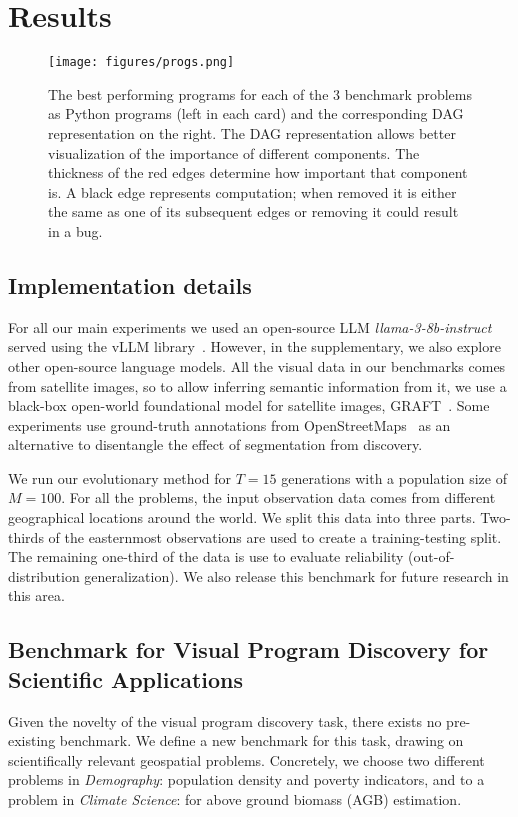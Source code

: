 \section{Results}
\label{sec:results}

\begin{figure}[ht]
    \centering
\texttt{[image: figures/progs.png]}
\caption{The best performing programs for each of the 3 benchmark problems as Python programs (left in each card) and the corresponding DAG representation on the right.
The DAG representation allows better visualization of the importance of different components.
The thickness of the red edges determine how important that component is. 
A black edge represents computation; when removed it is either the same as one of its subsequent edges or removing it could result in a bug.
}
\label{fig:mainresults}

\end{figure}

\subsection{Implementation details}
For all our main experiments we used an open-source LLM \emph{llama-3-8b-instruct}~\citep{dubey2024llama} served using the vLLM library~\citep{kwon2023vllm}.
However, in the supplementary, we also explore other open-source language models.
All the visual data in our benchmarks comes from satellite images, so to allow inferring semantic information from it, we use a black-box open-world foundational model for satellite images, GRAFT~\citep{mall2023graft}. 
Some experiments use ground-truth annotations from OpenStreetMaps~\citep{vargas2020osm} as an alternative to disentangle the effect of segmentation from discovery. 

We run our evolutionary method for $T=15$ generations with a population size of $M=100$. 
For all the problems, the input observation data comes from different geographical locations around the world. 
We split this data into three parts. Two-thirds of the easternmost observations are used to create a training-testing split. The remaining one-third of the data is use to evaluate reliability (out-of-distribution generalization). 
We also release this benchmark for future research in this area. 

\subsection{Benchmark for Visual Program Discovery for Scientific Applications}
\label{ssec:setup}
Given the novelty of the visual program discovery task, there exists no pre-existing benchmark.
We define a new benchmark for this task, drawing on scientifically relevant geospatial problems.
Concretely, we choose two different problems in \emph{Demography}: population density and poverty indicators, 
and to a problem in \emph{Climate Science}: for above ground biomass (AGB) estimation. 


